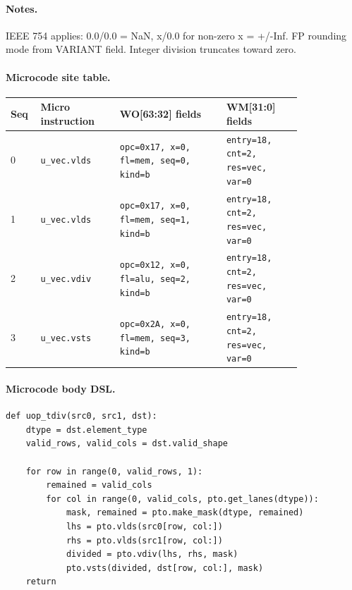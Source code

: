 \paragraph{Notes.}
IEEE 754 applies: 0.0/0.0 = NaN, x/0.0 for non-zero x = +/-Inf. FP rounding mode from VARIANT field. Integer division truncates toward zero.
\paragraph{Microcode site table.}
{\scriptsize
\begin{longtable}{@{}R{0.055\linewidth}L{0.23\linewidth}L{0.31\linewidth}L{0.22\linewidth}@{}}
\toprule
Seq & Micro instruction & WO[63:32] fields & WM[31:0] fields \\
 & \texttt{u\_vec.vlds} & \texttt{opc=0x17, x=0, fl=mem, seq=0, kind=b} & \texttt{entry=18, cnt=2, res=vec, var=0} \\
1 & \texttt{u\_vec.vlds} & \texttt{opc=0x17, x=0, fl=mem, seq=1, kind=b} & \texttt{entry=18, cnt=2, res=vec, var=0} \\
2 & \texttt{u\_vec.vdiv} & \texttt{opc=0x12, x=0, fl=alu, seq=2, kind=b} & \texttt{entry=18, cnt=2, res=vec, var=0} \\
3 & \texttt{u\_vec.vsts} & \texttt{opc=0x2A, x=0, fl=mem, seq=3, kind=b} & \texttt{entry=18, cnt=2, res=vec, var=0} \\
\bottomrule
\end{longtable}
}
\paragraph{Microcode body DSL.}
\begin{lstlisting}[style=ptocode]
def uop_tdiv(src0, src1, dst):
    dtype = dst.element_type
    valid_rows, valid_cols = dst.valid_shape

    for row in range(0, valid_rows, 1):
        remained = valid_cols
        for col in range(0, valid_cols, pto.get_lanes(dtype)):
            mask, remained = pto.make_mask(dtype, remained)
            lhs = pto.vlds(src0[row, col:])
            rhs = pto.vlds(src1[row, col:])
            divided = pto.vdiv(lhs, rhs, mask)
            pto.vsts(divided, dst[row, col:], mask)
    return
\end{lstlisting}
\Needspace{0.34\textheight}
